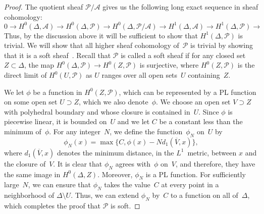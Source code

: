 \documentclass[11pt]{amsart}
\theoremstyle{definition}
\newcommand{\cA}{\mathcal A}
\newcommand{\cP}{\mathcal P}
\begin{document}
\begin{proof}
The quotient sheaf $\cP / \cA$ gives us the following long exact sequence in
sheaf cohomology:
\begin{equation*}
0 \rightarrow H^0(\Delta, \cA) \rightarrow
H^0(\Delta, \cP) \rightarrow H^0(\Delta, \cP / \cA) \rightarrow
H^1(\Delta, \cA) \rightarrow H^1(\Delta, \cP) \rightarrow
\end{equation*}
Thus, by the discussion above it will be sufficient to show that $H^1(\Delta, \cP)$
is trivial. We will show that all higher sheaf cohomology of~$\cP$ is trivial by
showing that it is a soft sheaf~\cite[Thm.~II.4.4.3]{godement}. Recall that
$\cP$ is called a soft sheaf if for any closed set $Z \subset \Delta$, the map
$H^0(\Delta, \cP) \rightarrow H^0(Z, \cP)$ is surjective, where $H^0(Z, \cP)$ is
the direct limit of $H^0(U, \cP)$ as $U$ ranges over all open sets~$U$
containing~$Z$.

We let $\phi$ be a function in $H^0(Z, \cP)$, which can be represented by a PL
function on some open set $U \supset Z$, which we also denote~$\phi$. We choose
an open set $V \supset Z$ with polyhedral boundary and whose closure is
contained in~$U$. Since $\phi$ is piecewise linear, it is bounded on~$U$ and we
let $C$ be a constant less than the minimum of~$\phi$. For any integer~$N$, we define the
function~$\phi_N$ on~$U$ by
\begin{equation*}
\phi_N(x) = \max\{C, \phi(x) - N d_1(\overline V, x)\},
\end{equation*}
where $d_1(\overline V,x)$ denotes the minimum distance, in the $L^1$~metric,
between $x$ and the closure of~$V$. It is clear that $\phi_N$ agrees with~$\phi$
on~$V$, and therefore, they have the same image in $H^0(\Delta, Z)$. Moreover,
$\phi_N$ is a PL function. For sufficiently large~$N$, we can
ensure that $\phi_N$ takes the value~$C$ at every point in a neighborhood of
$\Delta \setminus U$. Thus, we can extend $\phi_N$ by~$C$ to a function on all
of~$\Delta$, which completes the proof that $\cP$ is soft.
\end{proof}
\end{document}
